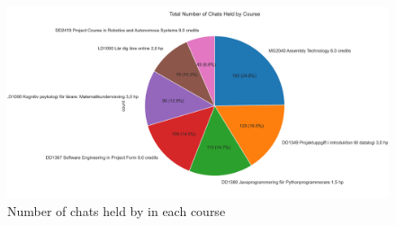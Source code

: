 \begin{figure}[H]
    \centering
    \includegraphics[width=\textwidth]{results/plots/assets/usage-05-number-of-chats-per-course.png}
    \caption{Number of chats held by in each course}
    \label{fig:usage_03_number_of_chats_per_course}
\end{figure}